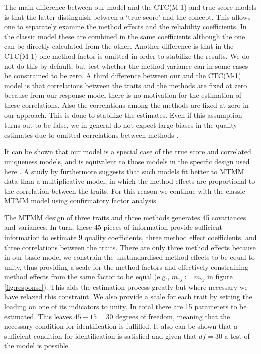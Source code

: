 \documentclass[a4paper,12pt]{article}
\begin{document}
The main difference between our model and the CTC(M-1) and true score models is that the latter distinguish between a `true score' and the concept. This allows one to separately examine the method effects and the reliability coefficients. In the classic model these are combined in the same coefficients although the one can be directly calculated from the other. Another difference is that in the CTC(M-1) one method factor is omitted in order to stabilize the results. We do not do this by default, but test whether the method variance can in some cases be constrained to be zero. A third difference between our and the CTC(M-1) model is that correlations between the traits and the methods are fixed at zero because from our response model there is no motivation for the estimation of these correlations. Also the correlations among the methods are fixed at zero in our approach. This is done to stabilize the estimates. Even if this assumption turns out to be false, we in general do not expect large biases in the quality estimates due to omitted correlations between methods \citep{corten_fit_2002}. 


It can be shown that our model is a special case of the true score and correlated uniqueness models, and is equivalent to those models in the specific design used here \citep{coenders_relationship_1998}.  A study by \citet{corten_fit_2002} furthermore suggests that such models fit better to MTMM data than a multiplicative model, in which the method effects are proportional to the correlation between the traits. For this reason we continue with the classic MTMM model using confirmatory factor analysis.

The MTMM design of three traits and three methods generates 45 covariances and variances. In turn, these 45 pieces of information provide sufficient information to estimate 9 quality coefficients, three method effect coefficients, and three correlations between the traits. There are only three method effects because in our basic model we constrain the unstandardised method effects to be equal to unity, thus providing a scale for the method factors and effectively constraining  method effects from the same factor to be equal (e.g., $m_{1j} := m_{2j}$ in figure \ref{fig:response}). This aids the estimation process greatly but where necessary we have relaxed this constraint. We also provide a scale for each trait by setting the loading on one of its indicators to unity. In total there are 15 parameters to be estimated. This leaves $45 - 15 = 30$ degrees of freedom, meaning that the necessary condition for identification is fulfilled. It also can be shown that a sufficient condition for identification is satisfied and given that $df=30$ a test of the model is possible.%
\end{document}
